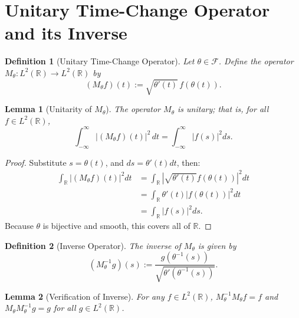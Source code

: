 \documentclass[11pt]{article}
\newtheorem{definition}{Definition}
\newtheorem{lemma}{Lemma}
\begin{document}
\section{Unitary Time-Change Operator and its Inverse}

\begin{definition}[Unitary Time-Change Operator]\label{def:unitary}
Let $\theta\in\mathcal{F}$. Define the operator $M_\theta : L^2(\mathbb{R}) \to L^2(\mathbb{R})$ by
\begin{equation}\label{eq:unitaryM}
    (M_\theta f)(t) := \sqrt{\theta'(t)}\,f(\theta(t)).
\end{equation}
\end{definition}

\begin{lemma}[Unitarity of $M_\theta$]\label{lem:unitary}
The operator $M_\theta$ is unitary; that is, for all $f \in L^2(\mathbb{R})$,
\begin{equation}\label{eq:unitnorm}
    \int_{-\infty}^{\infty} | (M_\theta f)(t) |^2 \, dt = \int_{-\infty}^{\infty} |f(s)|^2 ds.
\end{equation}
\end{lemma}

\begin{proof}
Substitute $s = \theta(t)$, and $ds = \theta'(t)dt$, then:
\begin{align*}
    \int_\mathbb{R} | (M_\theta f)(t) |^2 dt
    &= \int_\mathbb{R} | \sqrt{\theta'(t)} f(\theta(t)) |^2 dt  \\
    &= \int_\mathbb{R} \theta'(t) |f(\theta(t))|^2 dt \\
    &= \int_\mathbb{R} |f(s)|^2 ds.
\end{align*}
Because $\theta$ is bijective and smooth, this covers all of $\mathbb{R}$.
\end{proof}

\begin{definition}[Inverse Operator]\label{def:Mtheta_inv}
The inverse of $M_\theta$ is given by
\begin{equation}\label{eq:unitaryM_inverse}
    (M_\theta^{-1} g)(s) := \frac{g(\theta^{-1}(s))}{\sqrt{\theta'(\theta^{-1}(s))}}.
\end{equation}
\end{definition}

\begin{lemma}[Verification of Inverse]\label{lem:invert}
For any $f \in L^2(\mathbb{R})$, $M_\theta^{-1} M_\theta f = f$ and $M_\theta M_\theta^{-1} g = g$ for all $g \in L^2(\mathbb{R})$.
\end{lemma}
\end{document}
